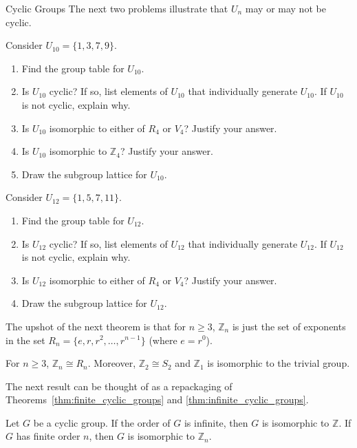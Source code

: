 \begin{section}{Cyclic Groups}
The next two problems illustrate that $U_n$ may or may not be cyclic.

\begin{problem}\label{prob:U10}
Consider $U_{10}=\{1,3,7,9\}$.
\begin{enumerate}[label=\textrm{(\alph*)}]
\item Find the group table for $U_{10}$.
\item Is $U_{10}$ cyclic? If so, list elements of $U_{10}$ that individually generate $U_{10}$.  If $U_{10}$ is not cyclic, explain why.
\item Is $U_{10}$ isomorphic to either of $R_4$ or $V_4$? Justify your answer.
\item Is $U_{10}$ isomorphic to $\mathbb{Z}_4$? Justify your answer.
\item Draw the subgroup lattice for $U_{10}$.
\end{enumerate}
\end{problem}

\begin{problem}\label{prob:U12}
Consider $U_{12}=\{1,5,7,11\}$.
\begin{enumerate}[label=\textrm{(\alph*)}]
\item Find the group table for $U_{12}$.
\item Is $U_{12}$ cyclic? If so, list elements of $U_{12}$ that individually generate $U_{12}$.  If $U_{12}$ is not cyclic, explain why.
\item Is $U_{12}$ isomorphic to either of $R_4$ or $V_4$? Justify your answer.
\item Draw the subgroup lattice for $U_{12}$.
\end{enumerate}
\end{problem}

The upshot of the next theorem is that for $n\geq 3$, $\mathbb{Z}_n$ is just the set of exponents in the set $R_n=\{e,r,r^2,\ldots,r^{n-1}\}$ (where $e=r^0$).

\begin{theorem}\label{thm:Zn_iso_to_Rn}
For $n\geq 3$, $\mathbb{Z}_n\cong R_n$. Moreover, $\mathbb{Z}_2\cong S_2$ and $\mathbb{Z}_1$ is isomorphic to the trivial group.
\end{theorem}

The next result can be thought of as a repackaging of Theorems~\ref{thm:finite_cyclic_groups} and \ref{thm:infinite_cyclic_groups}.

\begin{theorem}
Let $G$ be a cyclic group. If the order of $G$ is infinite, then $G$ is isomorphic to $\mathbb{Z}$. If $G$ has finite order $n$, then $G$ is isomorphic to $\mathbb{Z}_n$.
\end{theorem}


\end{section}
